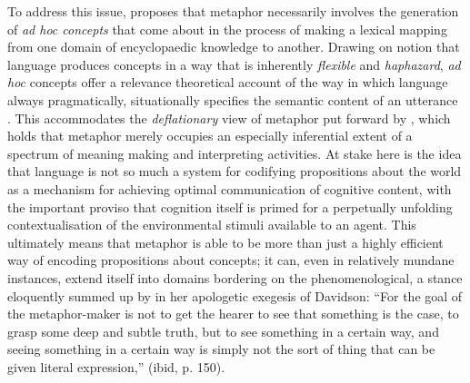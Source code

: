 To address this issue, \cite{Carston2010} proposes that metaphor necessarily involves the generation of \emph{ad hoc concepts} that come about in the process of making a lexical mapping from one domain of encyclopaedic knowledge to another.  Drawing on  notion that language produces concepts in a way that is inherently \emph{flexible} and \emph{haphazard}, \emph{ad hoc} concepts offer a relevance theoretical account of the way in which language always pragmatically, situationally specifies the semantic content of an utterance \citep{SperberEA1995}.  This accommodates the \emph{deflationary} view of metaphor put forward by \cite{SperberEA2012}, which holds that metaphor merely occupies an especially inferential extent of a spectrum of meaning making and interpreting activities.  At stake here is the idea that language is not so much a system for codifying propositions about the world as a mechanism for achieving optimal communication of cognitive content, with the important proviso that cognition itself is primed for a perpetually unfolding contextualisation of the environmental stimuli available to an agent.  This ultimately means that metaphor is able to be more than just a highly efficient way of encoding propositions about concepts; it can, even in relatively mundane instances, extend itself into domains bordering on the phenomenological, a stance eloquently summed up by \cite{Reimer2001} in her apologetic exegesis of Davidson: ``For the goal of the metaphor-maker is not to get the hearer to see that something is the case, to grasp some deep and subtle truth, but to see something in a certain way, and seeing something in a certain way is simply not the sort of thing that can be given literal expression,'' (ibid, p. 150).

